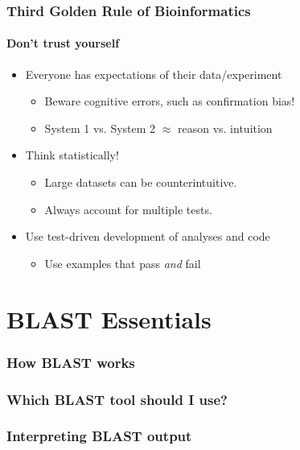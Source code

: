 \documentclass[table]{beamer}
\begin{document}
  \begin{frame}
    \frametitle{Third Golden Rule of Bioinformatics}
    \framesubtitle{Don't trust yourself}
	\begin{itemize}
	  \item Everyone has expectations of their data/experiment
	    \begin{itemize}
	      \item Beware cognitive errors, such as confirmation bias!
	      \item System 1 vs. System 2 $\approx$ reason vs. intuition
	    \end{itemize}
	  \item Think statistically! 
	    \begin{itemize}
	      \item Large datasets can be counterintuitive.
	      \item Always account for multiple tests.
	    \end{itemize}
	  \item Use test-driven development of analyses and code
	    \begin{itemize}
	      \item Use examples that pass \textit{and} fail
	    \end{itemize}	  
	\end{itemize}
  \end{frame}



  \section{BLAST Essentials}
  
    \begin{frame}
     \frametitle{How BLAST works}
    \end{frame}
   
    \begin{frame}
     \frametitle{Which BLAST tool should I use?}
    \end{frame}
     
    \begin{frame}
     \frametitle{Interpreting BLAST output}
    \end{frame}


  \section{}
\end{document}
